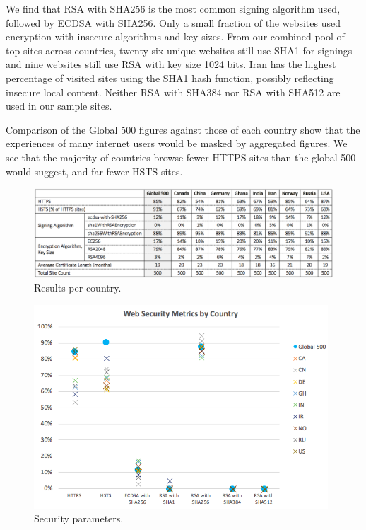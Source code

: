 \documentclass{easychair}
\begin{document}
We find that RSA with SHA256 is the most common signing algorithm used, 
followed by ECDSA with SHA256. Only a small fraction of the websites 
used encryption with insecure algorithms and key sizes. From our 
combined pool of top sites across countries, twenty-six unique websites 
still use SHA1 for signings and nine websites still use RSA 
with key size 1024 bits. Iran has the highest percentage of visited 
sites using the SHA1 hash function, possibly reflecting insecure local 
content. Neither RSA with SHA384 nor RSA with SHA512 are used in our 
sample sites.

Comparison of the Global 500 figures against those of each country show 
that the experiences of many internet users would be masked by 
aggregated figures. We see that the majority of countries browse fewer 
HTTPS sites than the global 500 would suggest, and far fewer HSTS sites.

\begin{figure}[tb]
	\begin{centering}
	\includegraphics[width=\textwidth]{final_results.png}
	\caption{Results per country.}
	\label{fig:results}
	\end{centering}
\end{figure}

\begin{figure}[tb]
	\begin{centering}
	\includegraphics[width=11cm]{security.png}
	\caption{Security parameters.}
	\label{fig:security}
	\end{centering}
\end{figure}
\end{document}
